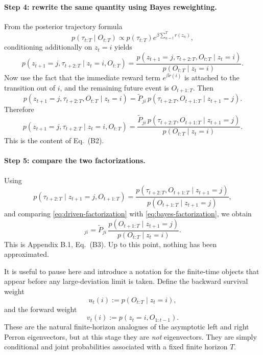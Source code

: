 \documentclass[11pt]{article}
\begin{document}
\paragraph{Step 4: rewrite the same quantity using Bayes reweighting.}
From the posterior trajectory formula
\begin{equation}
    p(\tau_{t:T}\mid O_{t:T})
    \propto
    p(\tau_{t:T})e^{\beta\sum_{n=t}^{T}r(z_n)},
\end{equation}
conditioning additionally on \(z_t=i\) yields
\begin{equation}
    p(z_{t+1}=j,\tau_{t+2:T}\mid z_t=i,O_{t:T})
    =
    \frac{
        p(z_{t+1}=j,\tau_{t+2:T},O_{t:T}\mid z_t=i)
    }{
        p(O_{t:T}\mid z_t=i)
    }.
\end{equation}
Now use the fact that the immediate reward term \(e^{\beta r(i)}\) is attached to the
transition out of \(i\), and the remaining future event is \(O_{t+1:T}\). Then
\begin{equation}
    p(z_{t+1}=j,\tau_{t+2:T},O_{t:T}\mid z_t=i)
    =
    \widetilde{P}_{ji}\,
    p(\tau_{t+2:T},O_{t+1:T}\mid z_{t+1}=j).
\end{equation}
Therefore
\begin{equation}
    p(z_{t+1}=j,\tau_{t+2:T}\mid z_t=i,O_{t:T})
    =
    \frac{
        \widetilde{P}_{ji}\,
        p(\tau_{t+2:T},O_{t+1:T}\mid z_{t+1}=j)
    }{
        p(O_{t:T}\mid z_t=i)
    }.
    \label{eq:bayes-factorization}
\end{equation}
This is the content of Eq.~(B2).

\paragraph{Step 5: compare the two factorizations.}
Using
\begin{equation}
    p(\tau_{t+2:T}\mid z_{t+1}=j,O_{t+1:T})
    =
    \frac{
        p(\tau_{t+2:T},O_{t+1:T}\mid z_{t+1}=j)
    }{
        p(O_{t+1:T}\mid z_{t+1}=j)
    },
\end{equation}
and comparing \eqref{eq:driven-factorization} with \eqref{eq:bayes-factorization}, we obtain
\begin{equation}
    [P_d^{(t,T)}]_{ji}
    =
    \widetilde{P}_{ji}\,
    \frac{
        p(O_{t+1:T}\mid z_{t+1}=j)
    }{
        p(O_{t:T}\mid z_t=i)
    }.
    \label{eq:finite-time-driven}
\end{equation}
This is Appendix B.1, Eq.~(B3). Up to this point, nothing has been approximated.

It is useful to pause here and introduce a notation for the finite-time objects that appear
before any large-deviation limit is taken. Define the backward survival weight
\begin{equation}
    u_t(i) := p(O_{t:T}\mid z_t=i),
\end{equation}
and the forward weight
\begin{equation}
    v_t(i) := p(z_t=i,O_{1:t-1}).
\end{equation}
These are the natural finite-horizon analogues of the asymptotic left and right Perron
eigenvectors, but at this stage they are \emph{not} eigenvectors. They are simply conditional
and joint probabilities associated with a fixed finite horizon \(T\).
\end{document}
